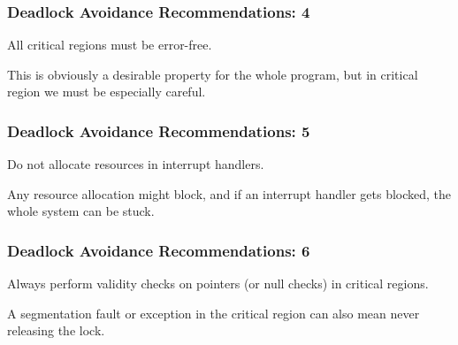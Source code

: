 \begin{frame}
\frametitle{Deadlock Avoidance Recommendations: 4}

All critical regions must be error-free. 

This is obviously a desirable property for the whole program, but in critical region we must be especially careful.

\end{frame}

\begin{frame}
\frametitle{Deadlock Avoidance Recommendations: 5}

Do not allocate resources in interrupt handlers. 

Any resource allocation might block, and if an interrupt handler gets blocked, the whole system can be stuck.

\end{frame}

\begin{frame}
\frametitle{Deadlock Avoidance Recommendations: 6}

Always perform validity checks on pointers (or null checks) in critical regions. 

A segmentation fault or exception in the critical region can also mean never releasing the lock.

\end{frame}




